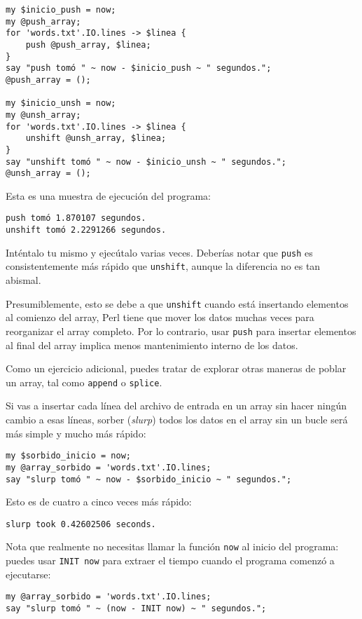 \begin{verbatim}
my $inicio_push = now;
my @push_array;
for 'words.txt'.IO.lines -> $linea {
    push @push_array, $linea;
}
say "push tomó " ~ now - $inicio_push ~ " segundos.";
@push_array = ();

my $inicio_unsh = now;
my @unsh_array;
for 'words.txt'.IO.lines -> $linea {
    unshift @unsh_array, $linea;
}
say "unshift tomó " ~ now - $inicio_unsh ~ " segundos.";
@unsh_array = ();
\end{verbatim}

Esta es una muestra de ejecución del programa:
\begin{verbatim}
push tomó 1.870107 segundos.
unshift tomó 2.2291266 segundos.
\end{verbatim}

Inténtalo tu mismo y ejecútalo varias veces. Deberías
notar que {\tt push} es consistentemente más rápido
que {\tt unshift}, aunque la diferencia no es tan abismal.

Presumiblemente, esto se debe a que {\tt unshift} 
cuando está insertando elementos al comienzo del array, 
Perl tiene que mover los datos muchas veces para 
reorganizar el array completo. Por lo contrario, 
usar {\tt push} para insertar elementos al final 
del array implica menos mantenimiento interno de los
datos.

Como un ejercicio adicional, puedes tratar de explorar
otras maneras de poblar un array, tal como {\tt append} o 
{\tt splice}.

Si vas a insertar cada línea del archivo de entrada
en un array sin hacer ningún cambio a esas líneas, 
sorber (\emph{slurp}) todos los datos en el array sin un bucle será
más simple y mucho más rápido:

\begin{verbatim}
my $sorbido_inicio = now;
my @array_sorbido = 'words.txt'.IO.lines;
say "slurp tomó " ~ now - $sorbido_inicio ~ " segundos.";
\end{verbatim}

Esto es de cuatro a cinco veces más rápido:
\begin{verbatim}
slurp took 0.42602506 seconds.
\end{verbatim}

Nota que realmente no necesitas llamar la función \verb|now| al
inicio del programa: puedes usar \verb'INIT now' para 
extraer el tiempo cuando el programa comenzó a ejecutarse:

\begin{verbatim}
my @array_sorbido = 'words.txt'.IO.lines;
say "slurp tomó " ~ (now - INIT now) ~ " segundos.";
\end{verbatim}

